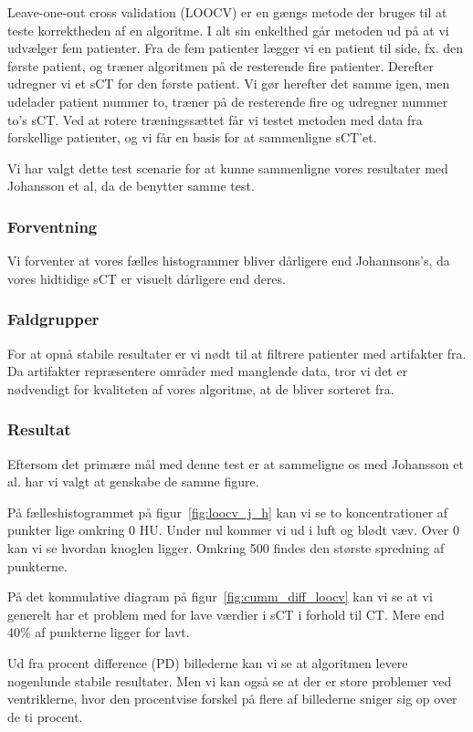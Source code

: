 Leave-one-out cross validation (LOOCV) er en gængs metode der bruges til
at teste korrektheden af en algoritme. I alt sin enkelthed går metoden
ud på at vi udvælger fem patienter. Fra de fem patienter lægger vi en
patient til side, fx. den første patient, og træner algoritmen på de
resterende fire patienter. Derefter udregner vi et sCT for den første
patient. Vi gør herefter det samme igen, men udelader patient nummer to,
træner på de resterende fire og udregner nummer to's sCT.  Ved at
rotere træningssættet får vi testet metoden med data fra forskellige
patienter, og vi får en basis for at sammenligne sCT'et.

Vi har valgt dette test scenarie for at kunne sammenligne vores resultater med Johansson et al, da de benytter samme test.

\subsubsection{Forventning}
Vi forventer at vores fælles histogrammer bliver dårligere end Johannsons's, da vores hidtidige sCT er visuelt dårligere end deres.


\subsubsection{Faldgrupper}
For at opnå stabile resultater er vi nødt til at filtrere patienter med artifakter fra. Da artifakter repræsentere områder med manglende data, tror vi det er nødvendigt for kvaliteten af vores algoritme, at de bliver sorteret fra.

\subsubsection{Resultat}

Eftersom det primære mål med denne test er at sammeligne os med Johansson et al. har vi valgt at genskabe de samme figure.

På fælleshistogrammet på figur~\ref{fig:loocv_j_h} kan vi se to koncentrationer af punkter lige omkring 0 HU. Under nul kommer vi ud i luft og blødt væv. Over 0 kan vi se hvordan knoglen ligger. Omkring 500 findes den største spredning af punkterne.

På det kommulative diagram på figur~\ref{fig:cumm_diff_loocv} kan vi se at vi generelt har et problem med for lave værdier i sCT i forhold til CT. Mere end 40\% af punkterne ligger for lavt.

Ud fra procent difference (PD) billederne kan vi se at algoritmen levere nogenlunde stabile resultater. Men vi kan også se at der er store problemer ved ventriklerne, hvor den procentvise forskel på flere af billederne sniger sig op over de ti procent.

